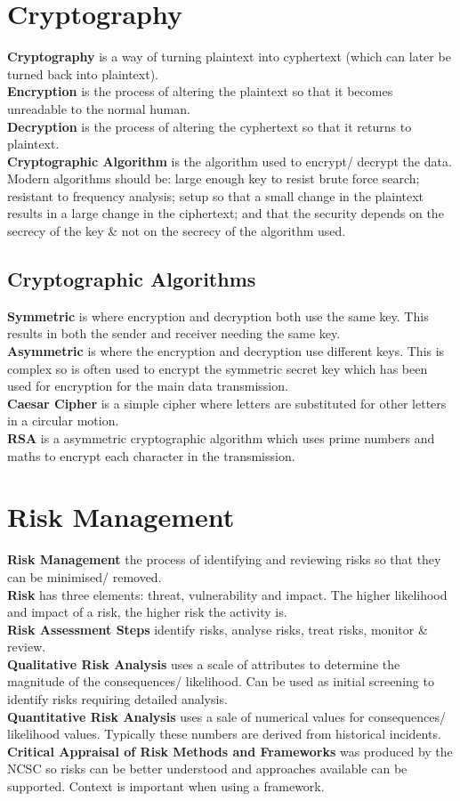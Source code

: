 \documentclass[a4paper,11pt]{article}
\begin{document}
\section{Cryptography}
\textbf{Cryptography} is a way of turning plaintext into cyphertext (which can later be turned back into plaintext).\\
\textbf{Encryption} is the process of altering the plaintext so that it becomes unreadable to the normal human.\\
\textbf{Decryption} is the process of altering the cyphertext so that it returns to plaintext.\\
\textbf{Cryptographic Algorithm} is the algorithm used to encrypt/ decrypt the data. Modern algorithms should be: large enough key to resist brute force search; resistant to frequency analysis; setup so that a small change in the plaintext results in a large change in the ciphertext; and that the security depends on  the secrecy of the key \& not on the secrecy of the algorithm used.

\subsection{Cryptographic Algorithms}
\textbf{Symmetric} is where encryption and decryption both use the same key. This results in both the sender and receiver needing the same key.\\
\textbf{Asymmetric} is where the encryption and decryption use different keys. This is complex so is often used to encrypt the symmetric secret key which has been used for encryption for the main data transmission.\\
\textbf{Caesar Cipher} is a simple cipher where letters are substituted for other letters in a circular motion.\\
\textbf{RSA} is a asymmetric cryptographic algorithm which uses prime numbers and maths to encrypt each character in the transmission. 

\section{Risk Management}
\textbf{Risk Management} the process of identifying and reviewing risks so that they can be minimised/ removed.\\
\textbf{Risk} has three elements: threat, vulnerability and impact. The higher likelihood and impact of a risk, the higher risk the activity is.\\
\textbf{Risk Assessment Steps} identify risks, analyse risks, treat risks, monitor \& review.\\
\textbf{Qualitative Risk Analysis} uses a scale of attributes to determine the magnitude of the consequences/ likelihood. Can be used as initial screening to identify risks requiring detailed analysis.\\
\textbf{Quantitative Risk Analysis} uses a sale of numerical values for consequences/ likelihood values. Typically these numbers are derived from historical incidents.\\
\textbf{Critical Appraisal of Risk Methods and Frameworks} was produced by the NCSC so risks can be better understood and approaches available can be supported. Context is important when using a framework.
\end{document}
